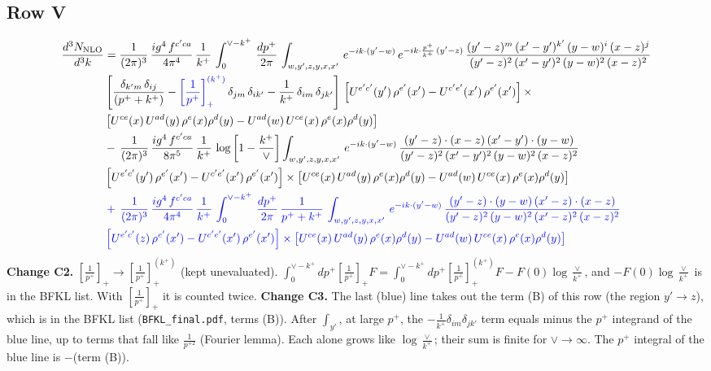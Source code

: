 \documentclass[9pt]{article}
\newcommand{\new}[1]{{\color{blue}#1}}
\newcommand{\nc}{\color{blue}}
\numberwithin{equation}{section}
\begin{document}
\subsection{Row V}
\begin{align}
    \frac{d^{3}N_{\rm NLO}}{d^{3}k} & = \frac{1}{(2\pi)^{3}}\, \frac{ig^{4}\,f^{c'ca}}{4\pi^{4}}\, \frac{1}{k^{+}}\,\int_{0}^{\vee-k^{+}}\, \frac{dp^{+}}{2\pi}\, \int_{w,y',z,y,x,x'}\, e^{-ik\cdot (y'-w)}\, e^{-ik\cdot \frac{p^{+}}{k^{+}}\,(y'-z)}\,\frac{(y'-z)^{m}\,(x'-y')^{k'}\,(y-w)^{i}\,(x-z)^{j}}{(y'-z)^{2}\,(x'-y')^{2}\,(y-w)^{2}\,(x-z)^{2}}\notag \\ & \left[\frac{\delta_{k'm}\,\delta_{ij}}{(p^{+}+k^{+})}-\new{\left[\frac{1}{p^{+}}\right]_{+}^{(k^{+})}}\,\delta_{jm}\,\delta_{ik'}-\frac{1}{k^{+}}\, \delta_{im}\, \delta_{jk'}\right]\, \left[U^{e'c'}(y')\,\rho^{e'}(x')-U^{c'e'}(x')\,\rho^{e'}(x')\right]\times \notag \\ &  \left[U^{ce}(x)\,U^{ad}(y)\,\rho^{e}(x)\rho^{d}(y)-U^{ad}(w)\,U^{ce}(x)\,\rho^{e}(x)\rho^{d}(y)\right]\notag \\ & -\,\frac{1}{(2\pi)^{3}}\, \frac{ig^{4}\,f^{c'ca}}{8\pi^{5}}\, \frac{1}{k^{+}}\, \log{\left[1-\frac{k^{+}}{\vee}\right]} \int_{w,y',z,y,x,x'}\, e^{-ik\cdot (y'-w)}\,\frac{(y'-z)\cdot (x-z)\,(x'-y')\cdot (y-w)}{(y'-z)^{2}\,(x'-y')^{2}\,(y-w)^{2}\,(x-z)^{2}}\notag \\ & \left[U^{e'c'}(y')\,\rho^{e'}(x')-U^{c'e'}(x')\,\rho^{e'}(x')\right]\times  \left[U^{ce}(x)\,U^{ad}(y)\,\rho^{e}(x)\rho^{d}(y)-U^{ad}(w)\,U^{ce}(x)\,\rho^{e}(x)\rho^{d}(y)\right]
\notag \\ & \nc +\,\frac{1}{(2\pi)^{3}}\, \frac{ig^{4}\,f^{c'ca}}{4\pi^{4}}\, \frac{1}{k^{+}}\,\int_{0}^{\vee-k^{+}}\, \frac{dp^{+}}{2\pi}\,\frac{1}{p^{+}+k^{+}}\, \int_{w,y',z,y,x,x'}\, e^{-ik\cdot (y'-w)}\,\frac{(y'-z)\cdot (y-w)\,(x'-z)\cdot (x-z)}{(y'-z)^{2}\,(y-w)^{2}\,(x'-z)^{2}\,(x-z)^{2}}\notag \\ & \nc \left[U^{e'c'}(z)\,\rho^{e'}(x')-U^{c'e'}(x')\,\rho^{e'}(x')\right]\times\left[U^{ce}(x)\,U^{ad}(y)\,\rho^{e}(x)\rho^{d}(y)-U^{ad}(w)\,U^{ce}(x)\,\rho^{e}(x)\rho^{d}(y)\right]
\end{align}
\new{\textbf{Change C2.} $\left[\frac{1}{p^+}\right]_+\to\left[\frac{1}{p^+}\right]_+^{(k^+)}$ (kept unevaluated). $\int_0^{\vee-k^+}dp^+\left[\frac{1}{p^+}\right]_+F=\int_0^{\vee-k^+}dp^+\left[\frac{1}{p^+}\right]_+^{(k^+)}F-F(0)\log\frac{\vee}{k^+}$, and $-F(0)\log\frac{\vee}{k^+}$ is in the BFKL list. With $\left[\frac{1}{p^+}\right]_+$ it is counted twice. \textbf{Change C3.} The last (blue) line takes out the term (B) of this row (the region $y'\to z$), which is in the BFKL list (\texttt{BFKL\_final.pdf}, terms (B)). After $\int_{y'}$, at large $p^+$, the $-\frac{1}{k^+}\delta_{im}\delta_{jk'}$ term equals minus the $p^+$ integrand of the blue line, up to terms that fall like $\frac{1}{p^{+2}}$ (Fourier lemma). Each alone grows like $\log\frac{\vee}{k^+}$; their sum is finite for $\vee\to\infty$. The $p^+$ integral of the blue line is $-$(term (B)).}
\end{document}
